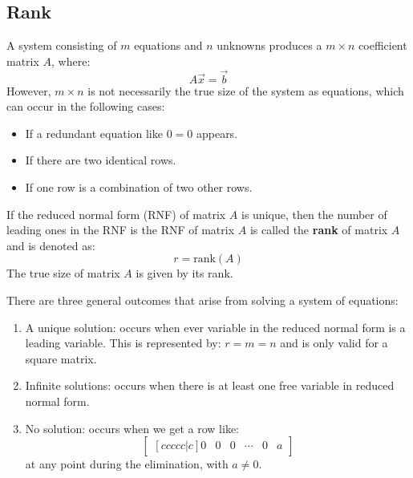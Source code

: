 \documentclass{article}
\let\oldtextbf\textbf
\renewcommand{\textbf}[1]{\oldtextbf{#1}\index{#1}}
\begin{document}
    \subsection{Rank}
    A system consisting of $m$ equations and $n$ unknowns produces a $m\times n$ coefficient matrix $A$, where:
    \begin{equation}
        A\vec{x} = \vec{b}
        \label{eq:}
    \end{equation}
    However, $m\times n$ is not necessarily the true size of the system as equations, which can occur in the following cases:
    \begin{itemize}
        \item If a redundant equation like $0=0$ appears.
        \item If there are two identical rows.
        \item If one row is a combination of two other rows.
    \end{itemize}
    \begin{definition}
        If the reduced normal form (RNF) of matrix $A$ is unique, then the number of leading ones in the RNF is the RNF of matrix $A$ is called the \textbf{rank} of matrix $A$ and is denoted as:
        \begin{equation}
            r = \text{rank}(A)
            \label{eq:}
        \end{equation}
        The true size of matrix $A$ is given by its rank.
    \end{definition}
    There are three general outcomes that arise from solving a system of equations:
    \begin{enumerate}
        \item A unique solution: occurs when ever variable in the reduced normal form is a leading variable. This is represented by:
        $
            r=m=n
        $ and is only valid for a square matrix.
        \item Infinite solutions: occurs when there is at least one free variable in reduced normal form. 
        \item No solution: occurs when we get a row like:
        \begin{equation}
            \begin{bmatrix}[ccccc|c]
                0&0&0&\cdots&0&a
            \end{bmatrix}
            \label{eq:}
        \end{equation}
        at any point during the elimination, with $a\neq 0$.
    \end{enumerate}
\end{document}
